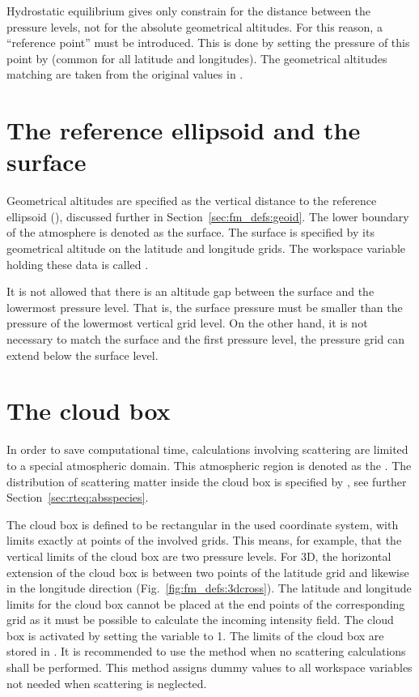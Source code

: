 Hydrostatic equilibrium gives only constrain for the distance between the
pressure levels, not for the absolute geometrical altitudes. For this reason, a
``reference point'' must be introduced. This is done by setting the pressure of
this point by  (common for all latitude and longitudes). The
geometrical altitudes matching  are taken from the original
values in . 


\section{The reference ellipsoid and the surface}
\label{sec:fm_defs:surf}

Geometrical altitudes are specified as the vertical distance to the reference
ellipsoid (), discussed further in
Section~\ref{sec:fm_defs:geoid}. The lower boundary of the atmosphere is
denoted as the surface. The surface is specified by its geometrical altitude on
the latitude and longitude grids. The workspace variable holding these data is
called .

It is not allowed that there is an altitude gap between the surface and
the lowermost pressure level.  That is, the surface pressure must be
smaller than the pressure of the lowermost vertical grid level. On
the other hand, it is not necessary to match the surface and the first
pressure level, the pressure grid can extend below the surface level.


\section{The cloud box}
\label{sec:fm_defs:cloudbox}
In order to save computational time, calculations involving scattering are
limited to a special atmospheric domain. This atmospheric region is denoted as
the . The distribution of scattering matter inside the
cloud box is specified by , see further
Section~\ref{sec:rteq:absspecies}.

The cloud box is defined to be rectangular in the used coordinate
system, with limits exactly at points of the involved grids. This
means, for example, that the vertical limits of the cloud box are two
pressure levels. For 3D, the horizontal extension of the cloud box
is between two points of the latitude grid and likewise in the
longitude direction (Fig.~\ref{fig:fm_defs:3dcross}). The latitude
and longitude limits for the cloud box cannot be placed at the end
points of the corresponding grid as it must be possible to calculate
the incoming intensity field. The cloud box is activated by setting
the variable  to 1.  The limits of the cloud
box are stored in .  It is recommended to
use the method  when no scattering calculations
shall be performed. This method assigns dummy values to all workspace
variables not needed when scattering is neglected.

